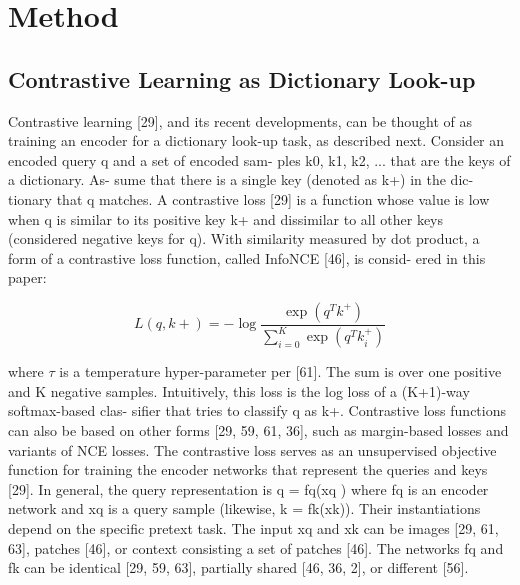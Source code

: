 \documentclass[10pt,twocolumn]{article}  %
\begin{document}
\section{Method}
\subsection{Contrastive Learning as Dictionary Look-up}
Contrastive learning [29], and its recent developments,
can be thought of as training an encoder for a dictionary
look-up task, as described next.
Consider an encoded query q and a set of encoded sam-
ples {k0, k1, k2, ...} that are the keys of a dictionary. As-
sume that there is a single key (denoted as k+) in the dic-
tionary that q matches. A contrastive loss [29] is a function
whose value is low when q is similar to its positive key k+
and dissimilar to all other keys (considered negative keys
for q). With similarity measured by dot product, a form of
a contrastive loss function, called InfoNCE [46], is consid-
ered in this paper:

\begin{equation}
    L(q, k+) = -\log\frac{\exp(q^T k^+)}{\sum_{i=0}^K \exp(q^T k_i^+)}
    \label{eq:equation1}
\end{equation}

where $\tau$ is a temperature hyper-parameter per [61]. The sum
is over one positive and K negative samples. Intuitively,
this loss is the log loss of a (K+1)-way softmax-based clas-
siﬁer that tries to classify q as k+. Contrastive loss functions
can also be based on other forms [29, 59, 61, 36], such as
margin-based losses and variants of NCE losses.
The contrastive loss serves as an unsupervised objective
function for training the encoder networks that represent the
queries and keys [29]. In general, the query representation
is q = fq(xq ) where fq is an encoder network and xq is a
query sample (likewise, k = fk(xk)). Their instantiations
depend on the speciﬁc pretext task. The input xq and xk can
be images [29, 61, 63], patches [46], or context consisting a
set of patches [46]. The networks fq and fk can be identical
[29, 59, 63], partially shared [46, 36, 2], or different [56].
\end{document}
